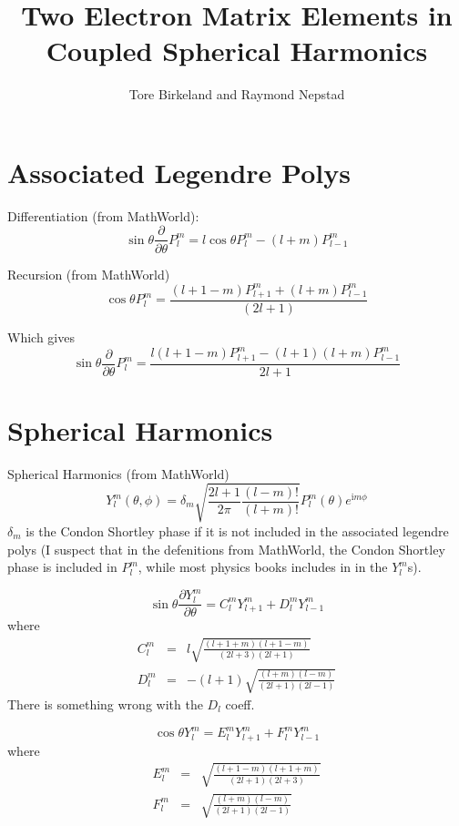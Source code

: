 \documentclass[a4paper,12pt]{paper}
\title{Two Electron Matrix Elements in Coupled Spherical Harmonics}
\author{Tore Birkeland and Raymond Nepstad}
\renewcommand{\imath}{{\mathrm i}}
\newcommand{\partialdiff}[2]{\frac{\partial #1}{\partial #2}}
\begin{document}
\section{Associated Legendre Polys}

Differentiation (from MathWorld):
\begin{equation}
	\sin \theta \partialdiff{}{\theta} P_l^m = l \cos \theta P_l^m - (l+m)
P_{l-1}^m
\end{equation}

Recursion (from MathWorld)
\begin{equation}
	\cos \theta P_l^m = \frac{ (l+1-m) P_{l+1}^m + (l+m) P_{l-1}^m }{ (2 l +
1) }
\end{equation}

Which gives
\begin{equation}
	\sin \theta \partialdiff{}{\theta} P_l^m = \frac{l(l+1-m) P_{l+1}^m 
- (l+1)(l+m) P_{l-1}^m}{2l + 1} 
\end{equation}


\section{Spherical Harmonics}

Spherical Harmonics (from MathWorld)
\begin{equation}
	\label{eqn:spherical-harmonics}
	Y_l^m(\theta, \phi) = \delta_m \sqrt{ \frac{2l + 1}{2 \pi}
\frac{(l-m)!}{(l+m)!} } P_l^m(\theta) e^{\imath m \phi}
\end{equation}
$\delta_m$ is the Condon Shortley phase if it is not included in the associated
legendre polys (I suspect that in the defenitions from MathWorld, the Condon
Shortley phase is included in $P_l^m$, while most physics books includes in in
the $Y_l^m$s).

\begin{equation}
	\sin \theta \partialdiff{Y_l^m}{\theta} = C_l^m Y_{l+1}^m
+ D_l^m Y_{l-1}^m
\end{equation}
where
\begin{eqnarray}
	C_l^m &=& l \sqrt{ \frac{(l+1+m)(l+1-m)}{(2l + 3)(2l + 1)}} \\
	D_l^m &=& - (l+1) \sqrt{ \frac{(l+m)(l-m)}{(2l + 1)(2l - 1)} }
\end{eqnarray}
There is something wrong with the $D_l$ coeff.

\begin{equation}
 	\cos \theta Y_l^m = E_l^m Y_{l+1}^m + F_l^m Y_{l-1}^m
\end{equation}
where
\begin{eqnarray}
	E_l^m &=& \sqrt{ \frac{(l+1-m)(l+1+m)}{(2l+1)(2l+3)} } \\
	F_l^m &=& \sqrt{ \frac{(l+m)(l-m)}{(2l+1)(2l-1)} }
\end{eqnarray}
\end{document}
